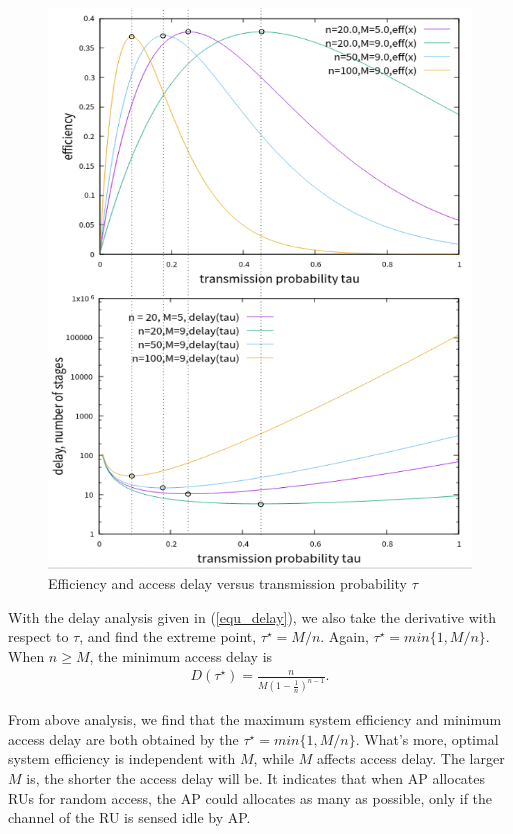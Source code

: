 \documentclass[journal]{IEEEtran}
\begin{document}
\begin{figure}[!ht]
\includegraphics[scale=0.42]{./figure/chp4/max_min.png}
\caption{Efficiency and access delay versus transmission probability $\tau$}
\label{fig_eff_def}
\end{figure}


With the delay analysis given in (\ref{equ_delay}), we also take the derivative with respect to $\tau$, and find the extreme point, $\tau^\star = M/n$. Again, $\tau^\star = min\lbrace 1, M/n\rbrace$. 
When $n\geq M$, the minimum access delay is 
\begin{align}
\label{equ_min_delay}
D(\tau^\star) = \frac{n}{M(1-\frac{1}{n})^{n-1}}.
\end{align}

From above analysis, we find that the maximum system efficiency and minimum access delay are both obtained by the $\tau^\star = min\lbrace 1, M/n\rbrace$.
What's more, optimal system efficiency is independent with $M$, while $M$ affects access delay. 
The larger $M$ is, the shorter the access delay will be. 
It indicates that when AP allocates RUs for random access, the AP could allocates as many as possible, only if the channel of the RU is sensed idle by AP. 
\end{document}

